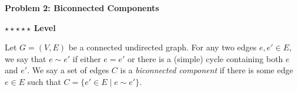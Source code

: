 \documentclass{article}\usepackage[utf8]{inputenc}
\begin{document}
\clearpage

\vspace{-2mm}\noindent\begin{mybox}{\begin{center}\textbf{\color{black}Problem 2: Biconnected Components}\end{center}}\end{mybox}\vspace{-2mm}
\begin{myboxot}\noindent\textbf{$\star\star\star\star\star$ Level}\end{myboxot} 

\noindent Let $G=(V,E)$ be a connected undirected graph. For any two edges $e,e'\in E$, we say that $e\sim e'$ if either $e=e'$ or there is a (simple) cycle containing both $e$ and $e'$. We say a set of edges $C$ is a \textit{biconnected component} if there is some edge $e\in E$ such that $C=\{e'\in E\mid e\sim e'\}$.
\end{document}
